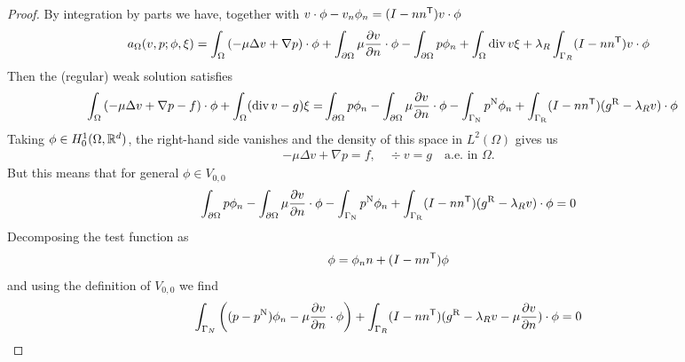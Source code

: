 \begin{proof}
By integration by parts we have, together with $v\cdot\phi - v_n\phi_n=(I-n{n}^{\mathsf{T}})v\cdot\phi$
%
\begin{align*}
a_{\Omega}(v,p; \phi,\xi) = \int_{\Omega} \left( -\mu \Delta v+\nabla p\right)\cdot\phi + 
\int_{\partial\Omega} \mu\frac{\partial v}{\partial n}\cdot\phi - \int_{\partial\Omega} p\phi_n
+\int_{\Omega} \operatorname{div} v \xi+ \lambda_R\int_{\Gamma_R}(I-n{n}^{\mathsf{T}})v\cdot\phi
\end{align*}
%
Then the (regular) weak solution satisfies
%
\begin{align*}
\int_{\Omega} \left( -\mu \Delta v+\nabla p -f\right)\cdot\phi +\int_{\Omega} (\operatorname{div} v-g) \xi
=& \int_{\partial\Omega} p\phi_n - \int_{\partial\Omega} \mu\frac{\partial v}{\partial n}\cdot\phi -\int_{\Gamma_{\rm N}} p^{\rm N}\phi_n+ \int_{\Gamma_{\rm R}} (I-n{n}^{\mathsf{T}})(g^{\rm R} -\lambda_R v)\cdot\phi
\end{align*}
%
Taking $\phi \in H^1_0(\Omega,\mathbb R^d)$, the right-hand side vanishes and the density of this space in $L^2(\Omega)$ gives us 
%
\begin{align*}
-\mu \Delta v+\nabla p = f,\quad \div v = g \quad  \mbox{a.e. in $\Omega$}.
\end{align*}
%
But this means that for general $\phi\in V_{0,0}$
%
\begin{align*}
\int_{\partial\Omega} p\phi_n - \int_{\partial\Omega} \mu\frac{\partial v}{\partial n}\cdot\phi -\int_{\Gamma_{\rm N}} p^{\rm N}\phi_n
+ \int_{\Gamma_{\rm R}} (I-n{n}^{\mathsf{T}})(g^{\rm R} -\lambda_R v)\cdot\phi=0
\end{align*}
%
Decomposing the test function as
%
\begin{align*}
\phi = \phi_n n + (I-n{n}^{\mathsf{T}})\phi
\end{align*}
%
and using the definition of $V_{0,0}$ we find
%
\begin{align*}
\int_{\Gamma_N} \left( (p-p^{\rm N})\phi_n - \mu\frac{\partial v}{\partial n}\cdot\phi\right) 
+ \int_{\Gamma_R} (I-n{n}^{\mathsf{T}})(g^{\rm R} -\lambda_R v - \mu\frac{\partial v}{\partial n})\cdot\phi =0
\end{align*}
%
\end{proof}
%
